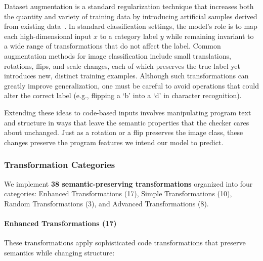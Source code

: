 \documentclass[acmsmall,screen,review,anonymous]{acmart}
\begin{document}
Dataset augmentation is a standard regularization technique that increases both the quantity and variety of training data by introducing artificial samples derived from existing data~\cite{bengio2017deep}. In standard classification settings, the model's role is to map each high-dimensional input $x$ to a category label $y$ while remaining invariant to a wide range of transformations that do not affect the label. Common augmentation methods for image classification include small translations, rotations, flips, and scale changes, each of which preserves the true label yet introduces new, distinct training examples. Although such transformations can greatly improve generalization, one must be careful to avoid operations that could alter the correct label (e.g., flipping a `b' into a `d' in character recognition).

Extending these ideas to code-based inputs involves manipulating program text and structure in ways that leave the semantic properties that the checker cares about unchanged. Just as a rotation or a flip preserves the image class, these changes preserve the program features we intend our model to predict.

\subsubsection{Transformation Categories}
\label{sec:transformations}

We implement \textbf{38 semantic-preserving transformations} organized into four categories: Enhanced Transformations (17), Simple Transformations (10), Random Transformations (3), and Advanced Transformations (8).

\paragraph{Enhanced Transformations (17)}
These transformations apply sophisticated code transformations that preserve semantics while changing structure:
\end{document}
